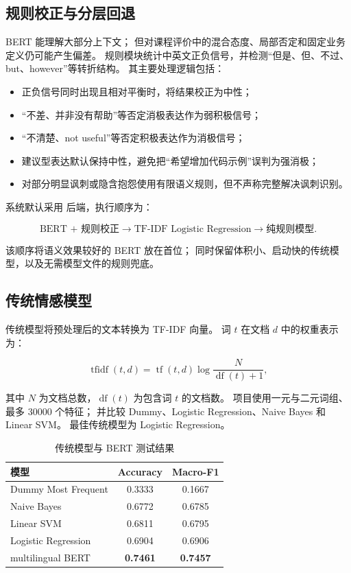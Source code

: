 \subsection{规则校正与分层回退}

BERT 能理解大部分上下文；
但对课程评价中的混合态度、局部否定和固定业务定义仍可能产生偏差。
规则模块统计中英文正负信号，并检测“但是、但、不过、but、however”等转折结构。
其主要处理逻辑包括：

\begin{itemize}
  \item 正负信号同时出现且相对平衡时，将结果校正为中性；
  \item “不差、并非没有帮助”等否定消极表达作为弱积极信号；
  \item “不清楚、not useful”等否定积极表达作为消极信号；
  \item 建议型表达默认保持中性，避免把“希望增加代码示例”误判为强消极；
  \item 对部分明显讽刺或隐含抱怨使用有限语义规则，但不声称完整解决讽刺识别。
\end{itemize}

系统默认采用  后端，执行顺序为：

\begin{equation}
  \text{BERT + 规则校正}
  \rightarrow \text{TF-IDF Logistic Regression}
  \rightarrow \text{纯规则模型}.
\end{equation}

该顺序将语义效果较好的 BERT 放在首位；
同时保留体积小、启动快的传统模型，以及无需模型文件的规则兜底。

\subsection{传统情感模型}

传统模型将预处理后的文本转换为 TF-IDF 向量。
词 \(t\) 在文档 \(d\) 中的权重表示为：

\begin{equation}
  \operatorname{tfidf}(t,d)
  = \operatorname{tf}(t,d)
  \log\frac{N}{\operatorname{df}(t)+1},
\end{equation}

其中 \(N\) 为文档总数，\(\operatorname{df}(t)\) 为包含词 \(t\) 的文档数。
项目使用一元与二元词组、最多 30000 个特征；
并比较 Dummy、Logistic Regression、Naive Bayes 和 Linear SVM。
最佳传统模型为 Logistic Regression。

\begin{table}[H]
  \centering
  \caption{传统模型与 BERT 测试结果}
  \label{tab:model-results}
  \small
  \begin{tabular}{lcc}
    \toprule
    模型 & Accuracy & Macro-F1 \\
    \midrule
    Dummy Most Frequent & 0.3333 & 0.1667 \\
    Naive Bayes & 0.6772 & 0.6785 \\
    Linear SVM & 0.6811 & 0.6795 \\
    Logistic Regression & 0.6904 & 0.6906 \\
    multilingual BERT & \textbf{0.7461} & \textbf{0.7457} \\
    \bottomrule
  \end{tabular}
\end{table}

